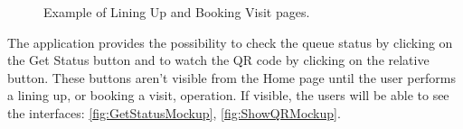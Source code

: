 \begin{figure}[H]
    \caption{Example of Lining Up and Booking Visit pages.}
    \label{fig:LiningBookingMockup}
\end{figure}

The application provides the possibility to check the queue status by clicking on the Get Status button and to watch the QR code by clicking on the relative button.
These buttons aren't visible from the Home page until the user performs a lining up, or booking a visit, operation.
If visible, the users will be able to see the interfaces: \ref{fig:GetStatusMockup}, \ref{fig:ShowQRMockup}.

